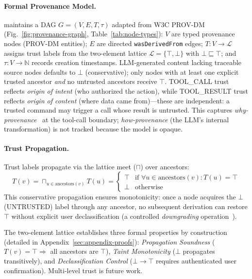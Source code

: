 \paragraph{Formal Provenance Model.}
\sys{} maintains a DAG $G = (V, E, T, \tau)$ adapted from W3C PROV-DM~\cite{prov-dm} (Fig.~\ref{fig:provenance-graph}, Table~\ref{tab:node-types}): $V$ are typed provenance nodes (PROV-DM entities); $E$ are directed \texttt{wasDerivedFrom} edges; $T: V \to \mathcal{L}$ assigns trust labels from the two-element lattice $\mathcal{L} = \{\top, \bot\}$ with $\bot \sqsubseteq \top$; and $\tau: V \to \mathbb{N}$ records creation timestamps. LLM-generated content lacking traceable source nodes defaults to $\bot$ (conservative); only nodes with at least one explicit trusted ancestor \emph{and} no untrusted ancestors receive $\top$. TOOL\_CALL trust reflects \emph{origin of intent} (who authorized the action), while TOOL\_RESULT trust reflects \emph{origin of content} (where data came from)---these are independent: a trusted command may trigger a call whose result is untrusted. This captures \emph{why-provenance}~\cite{buneman2001provenance} at the tool-call boundary; \emph{how-provenance} (the LLM's internal transformation) is not tracked because the model is opaque.

\paragraph{Trust Propagation.}
Trust labels propagate via the lattice meet ($\sqcap$) over ancestors:
\begin{equation}
\label{eq:trust-propagation}
T(v) = \sqcap_{u \in \text{ancestors}(v)} T(u) = \begin{cases} \top & \text{if } \forall u \in \text{ancestors}(v) : T(u) = \top \\ \bot & \text{otherwise} \end{cases}
\end{equation}
This conservative propagation ensures monotonicity: once a node acquires the $\bot$ (UNTRUSTED) label through any ancestor, no subsequent derivation can restore $\top$ without explicit user declassification (a controlled \emph{downgrading} operation~\cite{difc-survey}).

The two-element lattice establishes three formal properties by construction (detailed in Appendix~\ref{sec:appendix-proofs}): \emph{Propagation Soundness} ($T(v)=\top \Rightarrow$ all ancestors are $\top$), \emph{Taint Monotonicity} ($\bot$ propagates transitively), and \emph{Declassification Control} ($\bot \to \top$ requires authenticated user confirmation). Multi-level trust is future work.

